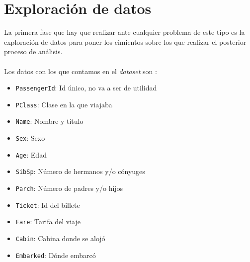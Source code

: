 
	
\setcounter{page}{0}

\maketitle %
\thispagestyle{empty}

\newpage %

\tableofcontents %

\listoftables


\newpage


\section{Exploración de datos}

La primera fase que hay que realizar ante cualquier problema de este tipo es la exploración de datos para poner los cimientos sobre los que realizar el posterior proceso de análisis.
\\ \\
Los datos con los que contamos en el \textit{dataset} son \cite{KaggleTitanicData}:

\begin{itemize}
	\item \texttt{PassengerId}: Id único, no va a ser de utilidad
	\item \texttt{PClass}: Clase en la que viajaba
	\item \texttt{Name}: Nombre y título
	\item \texttt{Sex}: Sexo
	\item \texttt{Age}: Edad
	\item \texttt{SibSp}: Número de hermanos y/o cónyuges
	\item \texttt{Parch}: Número de padres y/o hijos
	\item \texttt{Ticket}: Id del billete
	\item \texttt{Fare}: Tarifa del viaje
	\item \texttt{Cabin}: Cabina donde se alojó
	\item \texttt{Embarked}: Dónde embarcó
\end{itemize}

